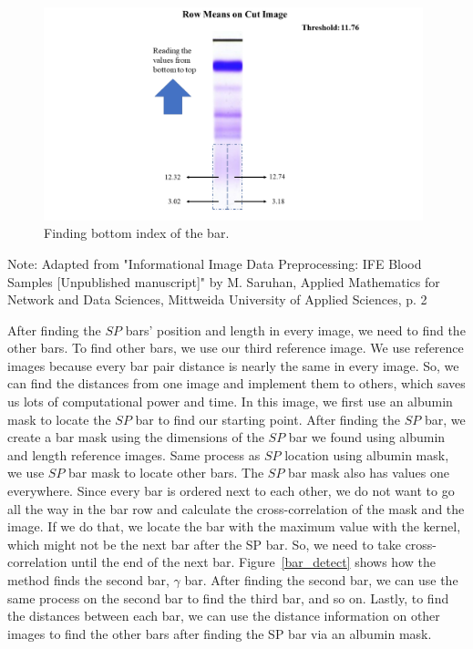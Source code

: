 \begin{figure}[H]
    \centering
    \includegraphics[width=0.98\textwidth]{images/old imgs/lenght_detection.png}
    \caption{Finding bottom index of the bar.}
\label{bot2top}
\end{figure}

\noindent Note: Adapted from "Informational Image Data Preprocessing: IFE Blood Samples
[Unpublished manuscript]" by M. Saruhan, Applied Mathematics for Network and Data Sciences,
Mittweida University of Applied Sciences, p. 2 ~\cite{mypap}
\vspace{10pt}

After finding the $SP$ bars’ position and length in every image, we need to find the other bars. To find other bars, we use our third reference image. We use reference images because every bar pair distance is nearly the same in every image. So, we can find the distances from one image and implement them to others, which saves us lots of computational power and time. In this image, we first use an albumin mask to locate the $SP$ bar to find our starting point. After finding the $SP$ bar, we create a bar mask using the dimensions of the $SP$ bar we found using albumin and length reference images. Same process as $SP$ location using albumin mask, we use $SP$ bar mask to locate other bars. The $SP$ bar mask also has values one everywhere. Since every bar is ordered next to each other, we do not want to go all the way in the bar row and calculate the cross-correlation of the mask and the image. If we do that, we locate the bar with the maximum value with the kernel, which might not be the next bar after the SP bar. So, we need to take cross-correlation until the end of the next bar. Figure~\ref{bar_detect} shows how the method finds the second bar, $\gamma$ bar. After finding the second bar, we can use the same process on the second bar to find the third bar, and so on. Lastly, to find the distances between each bar, we can use the distance information on other images to find the other bars after finding the SP bar via an albumin mask.

